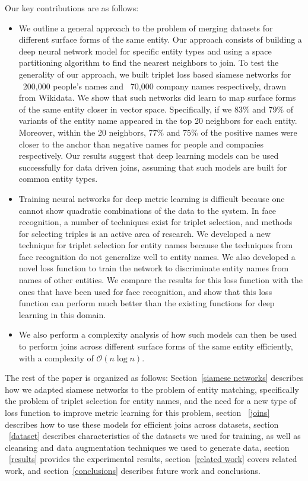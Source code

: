 Our key contributions are as follows:
\begin{itemize}
\item We outline a general approach to the problem of merging datasets for different surface forms of the same entity.  Our approach consists of building a deep neural network model for specific entity types and using a space partitioning algorithm to find the nearest neighbors to join.  To test the generality of our approach, we built triplet loss based siamese networks for ~200,000 people's names and ~70,000 company names respectively, drawn from Wikidata.  We show that such networks did learn to map surface forms of the same entity closer in vector space.  Specifically, if we 83\% and 79\% of variants of the entity name appeared in the top 20 neighbors for each entity.  Moreover, within the 20 neighbors, 77\% and 75\% of the positive names were closer to the anchor than negative names for people and companies respectively.  Our results suggest that deep learning models can be used successfully for data driven joins, assuming that such models are built for common entity types.
\item Training neural networks for deep metric learning is difficult because one cannot show quadratic combinations of the data to the system.  In face recognition, a number of techniques exist for triplet selection, and methods for selecting triples is an active area of research.  We developed a new technique for triplet selection for entity names because the techniques from face recognition do not generalize well to entity names.  We also developed a novel loss function to train the network to discriminate entity names from names of other entities.  We compare the results for this loss function with the ones that have been used for face recognition, and show that this loss function can perform much better than the existing functions for deep learning in this domain.
\item We also perform a complexity analysis of how such models can then be used to perform joins across different surface forms of the same entity efficiently, with a complexity of $\mathcal{O}(n\log{}n)$.  
\end{itemize} 

The rest of the paper is organized as follows: Section~\ref{siamese networks} describes how we adapted siamese networks to the problem of entity matching, specifically the problem of triplet selection for entity names, and the need for a new type of loss function to improve metric learning for this problem, section ~\ref{joins} describes how to use these models for efficient joins across datasets, section ~\ref{dataset} describes characteristics of the datasets we used for training, as well as cleansing and data augmentation techniques we used to generate data, section ~\ref{results} provides the experimental results, section~\ref{related work} covers related work, and section~\ref{conclusions} describes future work and conclusions.
